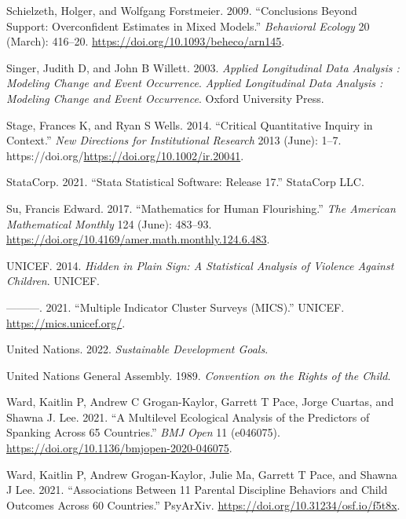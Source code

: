 \documentclass[
  letterpaper,
  DIV=11,
  numbers=noendperiod]{scrreprt}
\newlength{\cslhangindent}
\newlength{\cslentryspacingunit} %
\newenvironment{CSLReferences}[2] %
 {%
  \setlength{\parindent}{0pt}
  \ifodd #1
  \let\oldpar\par
  \def\par{\hangindent=\cslhangindent\oldpar}
  \fi
  \setlength{\parskip}{#2\cslentryspacingunit}
 }%
 {}
\begin{document}
\begin{CSLReferences}{1}{0}
\leavevmode{}%
Schielzeth, Holger, and Wolfgang Forstmeier. 2009. {``Conclusions Beyond
Support: Overconfident Estimates in Mixed Models.''} \emph{Behavioral
Ecology} 20 (March): 416--20.
\url{https://doi.org/10.1093/beheco/arn145}.

\leavevmode{}%
Singer, Judith D, and John B Willett. 2003. \emph{Applied Longitudinal
Data Analysis : Modeling Change and Event Occurrence}. \emph{Applied
Longitudinal Data Analysis : Modeling Change and Event Occurrence}.
Oxford University Press.

\leavevmode{}%
Stage, Frances K, and Ryan S Wells. 2014. {``Critical Quantitative
Inquiry in Context.''} \emph{New Directions for Institutional Research}
2013 (June): 1--7.
https://doi.org/\url{https://doi.org/10.1002/ir.20041}.

\leavevmode{}%
StataCorp. 2021. {``Stata Statistical Software: Release 17.''} StataCorp
LLC.

\leavevmode{}%
Su, Francis Edward. 2017. {``Mathematics for Human Flourishing.''}
\emph{The American Mathematical Monthly} 124 (June): 483--93.
\url{https://doi.org/10.4169/amer.math.monthly.124.6.483}.

\leavevmode{}%
UNICEF. 2014. \emph{Hidden in Plain Sign: A Statistical Analysis of
Violence Against Children}. UNICEF.

\leavevmode{}%
---------. 2021. {``Multiple Indicator Cluster Surveys (MICS).''}
UNICEF. \url{https://mics.unicef.org/}.

\leavevmode{}%
United Nations. 2022. \emph{Sustainable Development Goals}.

\leavevmode{}%
United Nations General Assembly. 1989. \emph{Convention on the Rights of
the Child}.

\leavevmode{}%
Ward, Kaitlin P, Andrew C Grogan-Kaylor, Garrett T Pace, Jorge Cuartas,
and Shawna J. Lee. 2021. {``{A Multilevel Ecological Analysis of the
Predictors of Spanking Across 65 Countries}.''} \emph{BMJ Open} 11
(e046075). \url{https://doi.org/10.1136/bmjopen-2020-046075}.

\leavevmode{}%
Ward, Kaitlin P, Andrew Grogan-Kaylor, Julie Ma, Garrett T Pace, and
Shawna J Lee. 2021. {``Associations Between 11 Parental Discipline
Behaviors and Child Outcomes Across 60 Countries.''} PsyArXiv.
\url{https://doi.org/10.31234/osf.io/f5t8x}.


\end{CSLReferences}
\end{document}

